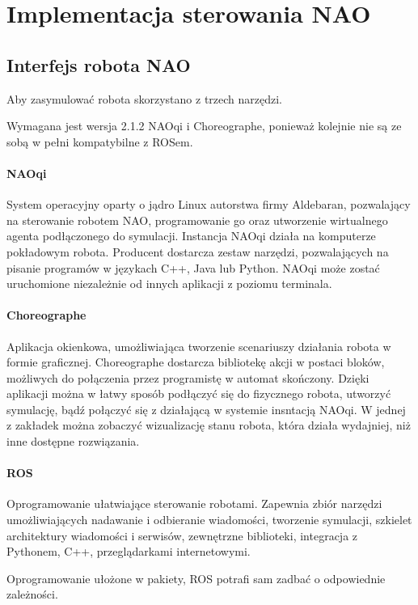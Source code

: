 \chapter{Implementacja sterowania NAO}
\label{chap:implementacja}
\section{Interfejs robota NAO}

Aby zasymulować robota skorzystano z trzech narzędzi. 

Wymagana jest wersja 2.1.2 NAOqi i Choreographe, ponieważ kolejnie nie są ze sobą w pełni kompatybilne z ROSem.

\subsubsection{NAOqi} System operacyjny oparty o jądro Linux autorstwa firmy Aldebaran, pozwalający na sterowanie robotem NAO, programowanie go oraz utworzenie wirtualnego agenta podłączonego do symulacji. Instancja NAOqi działa na komputerze pokładowym robota. Producent dostarcza zestaw narzędzi, pozwalających na pisanie programów w językach C++, Java lub Python. NAOqi może zostać uruchomione niezależnie od innych aplikacji z poziomu terminala.

\subsubsection{Choreographe} Aplikacja okienkowa, umożliwiająca tworzenie scenariuszy działania robota w formie graficznej. Choreographe dostarcza bibliotekę akcji w postaci bloków, możliwych do połączenia przez programistę w automat skończony. Dzięki aplikacji można w łatwy sposób podłączyć się do fizycznego robota, utworzyć symulację, bądź połączyć się z działającą w systemie insntacją NAOqi. W jednej z zakładek można zobaczyć wizualizację stanu robota, która działa wydajniej, niż inne dostępne rozwiązania.

\subsubsection{ROS} 
\label{subsec:ROS}
Oprogramowanie ułatwiające sterowanie robotami. Zapewnia zbiór narzędzi umożliwiających nadawanie i odbieranie wiadomości, tworzenie symulacji, szkielet architektury wiadomości i serwisów, zewnętrzne biblioteki, integracja z Pythonem, C++, przeglądarkami internetowymi.

Oprogramowanie ułożone w pakiety, ROS potrafi sam zadbać o odpowiednie zależności.

